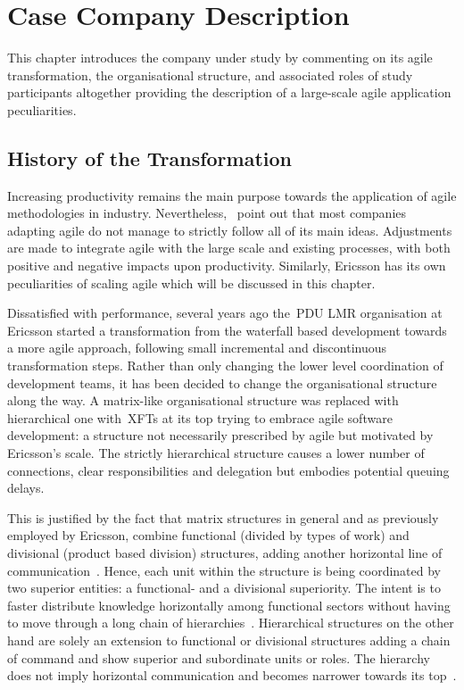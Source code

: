 \chapter{Case Company Description}
\label{chap:case-company-description}

This chapter introduces the company under study by commenting on its agile transformation, the organisational structure, and associated roles of study participants altogether providing the description of a large-scale agile application peculiarities.

\section{History of the Transformation}

Increasing productivity remains the main purpose towards the application of agile methodologies in industry. Nevertheless,~\citet{badampudi2013proddelay} point out that most companies adapting agile do not manage to strictly follow all of its main ideas. Adjustments are made to integrate agile with the large scale and existing processes, with both positive and negative impacts upon productivity. Similarly, Ericsson has its own peculiarities of scaling agile which will be discussed in this chapter.

Dissatisfied with performance, several years ago the~\ac{PDU LMR} organisation at Ericsson started a transformation from the waterfall based development towards a more agile approach, following small incremental and discontinuous transformation steps. Rather than only changing the lower level coordination of development teams, it has been decided to change the organisational structure along the way. A matrix-like organisational structure was replaced with hierarchical one with~\acp{XFT} at its top trying to embrace agile software development: a structure not necessarily prescribed by agile but motivated by Ericsson's scale. The strictly hierarchical structure causes a lower number of connections, clear responsibilities and delegation but embodies potential queuing delays. 

This is justified by the fact that matrix structures in general and as previously employed by Ericsson, combine functional (divided by types of work) and divisional (product based division) structures, adding another horizontal line of communication~\citep{price2007hrm}. Hence, each unit within the structure is being coordinated by two superior entities: a functional- and a divisional superiority. The intent is to faster distribute knowledge horizontally among functional sectors without having to move through a long chain of hierarchies~\citep{galbraith2008matrix}. 
Hierarchical structures on the other hand are solely an extension to functional or divisional structures adding a chain of command and show superior and subordinate units or roles. The hierarchy does not imply horizontal communication and becomes narrower towards its top~\citep{healeyprojectmanagement}.

